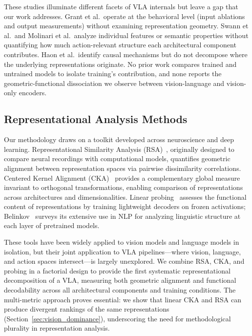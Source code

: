These studies illuminate different facets of VLA internals but leave a gap that our work addresses.
Grant et al.\ operate at the behavioral level (input ablations and output measurements) without examining representation geometry.
Swann et al.\ and Molinari et al.\ analyze individual features or semantic properties without quantifying how much action-relevant structure each architectural component contributes.
Haon et al.\ identify causal mechanisms but do not decompose where the underlying representations originate.
No prior work compares trained and untrained models to isolate training's contribution, and none reports the geometric-functional dissociation we observe between vision-language and vision-only encoders.

\subsection{Representational Analysis Methods}

Our methodology draws on a toolkit developed across neuroscience and deep learning.
Representational Similarity Analysis (RSA)~\cite{kriegeskorte2008}, originally designed to compare neural recordings with computational models, quantifies geometric alignment between representation spaces via pairwise dissimilarity correlations.
Centered Kernel Alignment (CKA)~\cite{kornblith2019} provides a complementary global measure invariant to orthogonal transformations, enabling comparison of representations across architectures and dimensionalities.
Linear probing~\cite{alain2017} assesses the functional content of representations by training lightweight decoders on frozen activations; Belinkov~\cite{belinkov2022} surveys its extensive use in NLP for analyzing linguistic structure at each layer of pretrained models.

These tools have been widely applied to vision models and language models in isolation, but their joint application to VLA pipelines---where vision, language, and action spaces intersect---is largely unexplored.
We combine RSA, CKA, and probing in a factorial design to provide the first systematic representational decomposition of a VLA, measuring both geometric alignment and functional decodability across all architectural components and training conditions.
The multi-metric approach proves essential: we show that linear CKA and RSA can produce divergent rankings of the same representations (Section~\ref{sec:vision_dominance}), underscoring the need for methodological plurality in representation analysis.

